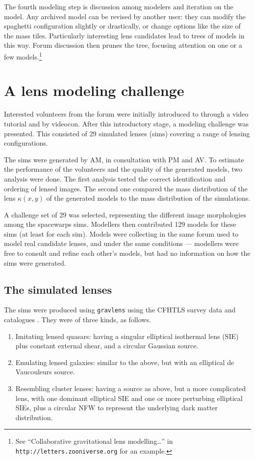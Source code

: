 The fourth modeling step is discussion among modelers and iteration on
the model.  Any archived model can be revised by another user: they
can modify the spaghetti configuration slightly or drastically, or
change options like the size of the mass tiles.  Particularly
interesting lens candidates lead to trees of models in this way.
Forum discussion then prunes the tree, focusing attention on one or a
few models.\footnote{See ``Collaborative gravitational lens
  modelling\dots'' in {\tt http://letters.zooniverse.org} for an
  example.}


\section{A lens modeling challenge} \label{sec:mod_challenge}

Interested volunteers from the \sw forum were initially introduced to
\spl through a video tutorial and by videocon.  After this
introductory stage, a modeling challenge was presented.  This
consisted of 29 simulated lenses (sims) covering a range of lensing
configurations.

The \sw sims were generated by AM, in consultation with PM and AV.
To estimate the performance of the volunteers and the quality of the generated models, two analysis  were done.
The first analysis tested the correct identification and ordering of lensed images.
The second one compared the mass distribution of the lens $\kappa(x, y)$ of the generated models to the mass distribution of the simulations.

A challenge set of 29 was selected, representing the different image
morphologies among the spacewarps sims.  Modellers then contributed
129 models for these sims (at least for each sim).  Models were
collecting in the same forum used to model real candidate lenses, and
under the same conditions --- modellers were free to consult and
refine each other's models, but had no information on how the sims
were generated.

\subsection{The simulated lenses} \label{sec:sims}

The sims were produced using {\tt gravlens}
\citep{2001astro.ph..2341K,2001astro.ph..2340K} using the CFHTLS survey data
and catalogues \cite{Coupon2009}. They were of three
kinds, as follows.

\begin{enumerate}
  \item Imitating lensed quasars: having a singular elliptical
    isothermal lens (SIE) plus constant external shear, and a circular
    Gaussian source.
  \item Emulating lensed galaxies: similar to the above, but with an
    elliptical de Vaucouleurs source.
  \item Resembling cluster lenses: having a source as above, but a
    more complicated lens, with one dominant elliptical SIE and
    one or more perturbing elliptical SIEs, plus a circular NFW
    \citep{1996ApJ...462..563N,1997ApJ...490..493N} to represent
    the underlying dark matter distribution.
\end{enumerate}

